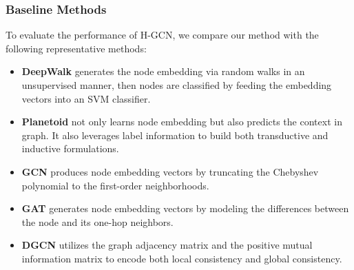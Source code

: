 \documentclass{article}
\begin{document}
\begin{table}
	\centering
	\caption{Statistics of datasets used in experiments}
	\label{tab:datasets}
\end{table}

\subsubsection{Baseline Methods}

To evaluate the performance of H-GCN, we compare our method with the following representative methods:

\begin{itemize}
	\item {\bf DeepWalk} \cite{Perozzi:2014:DOL:2623330.2623732} generates the node embedding via random walks in an unsupervised manner, then nodes are classified by feeding the embedding vectors into an SVM classifier.
	\item {\bf Planetoid} \cite{pmlr-v48-yanga16} not only learns node embedding but also predicts the context in graph. It also leverages label information to build both transductive and inductive formulations.
	\item {\bf GCN} \cite{Kipf:2016tc} produces node embedding vectors by truncating the Chebyshev polynomial to the first-order neighborhoods.
	\item {\bf GAT} \cite{Velickovic:2018we} generates node embedding vectors by modeling the differences between the node and its one-hop neighbors.
	\item {\bf DGCN} \cite{Zhuang:2018:DGC:3178876.3186116} utilizes the graph adjacency matrix and the positive mutual information matrix to encode both local consistency and global consistency.
\end{itemize}
\end{document}
